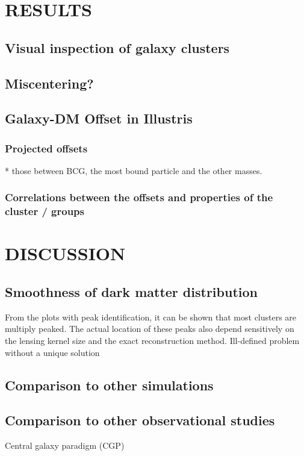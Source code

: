 \section{RESULTS} 

\label{sec:results}

\subsection{Visual inspection of galaxy clusters}
\subsection{Miscentering?}


\subsection{Galaxy-DM Offset in Illustris}
\subsubsection{Projected offsets}
* those between BCG, the most bound particle and the other masses. 


\subsubsection{Correlations between the offsets and properties of the cluster / groups}
\section{DISCUSSION}

\subsection{Smoothness of dark matter distribution}
From the plots with peak identification, it can be shown that most clusters are
multiply peaked. The actual location of these peaks also depend sensitively 
on the lensing kernel size and the exact reconstruction method.  
Ill-defined problem without a unique solution 


\label{sec:discussion}
\subsection{Comparison to other simulations}
\subsection{Comparison to other observational studies}
Central galaxy paradigm (CGP)


